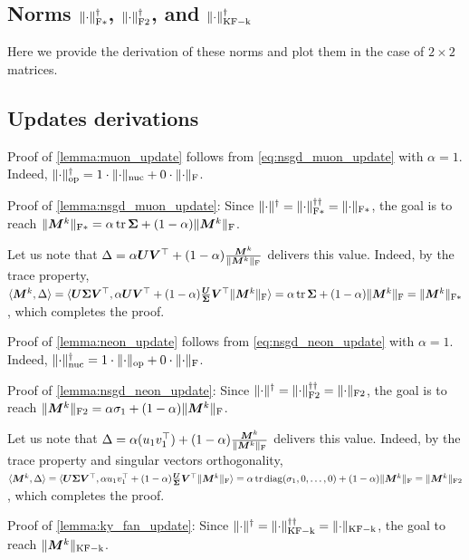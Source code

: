 \documentclass{article} %
\newcommand{\norm}[1]{\lVert #1\rVert}
\DeclarePairedDelimiter{\normf}{\|}{\|_\mathrm{F}}
\DeclarePairedDelimiter{\normkfk}{\|}{\|_\mathrm{KF-k}}
\DeclarePairedDelimiter{\normfstar}{\|}{\|_\mathrm{F*}}
\DeclarePairedDelimiter{\normftwo}{\|}{\|_\mathrm{F2}}
\DeclarePairedDelimiter{\norms}{\|}{\|_{\mathrm{op}}}
\DeclarePairedDelimiter{\normn}{\|}{\|_{\mathrm{nuc}}}
\def\<#1,#2>{\langle #1,#2\rangle}
\DeclareMathOperator{\tr}{tr}
\DeclareMathOperator{\diag}{diag}
\begin{document}
\subsection{Norms $\normfstar{\cdot}^\dagger$, $\normftwo{\cdot}^\dagger$, and $\normkfk{\cdot}^\dagger$}
Here we provide the derivation of these norms and plot them in the case of $2\times2$ matrices.

\subsection{Updates derivations}

Proof of \cref{lemma:muon_update} follows from \cref{eq:nsgd_muon_update} with $\alpha=1$. Indeed, $\norms{\cdot}^\dagger=1\cdot\normn{\cdot} + 0 \cdot \normf{\cdot} $.

Proof of \cref{lemma:nsgd_muon_update}:
Since $\norm{\cdot}^\dagger = \normfstar{\cdot}^{\dagger\dagger} = \normfstar{\cdot}$, the goal is to reach $\normfstar{\mM^k} = \alpha \tr{\mSigma} + (1-\alpha) \normf{\mM^k}$.

Let us note that $\Delta = \alpha \mU \mV^\top + (1-\alpha) \frac{\mM^k}{\normf{\mM^k}}$ delivers this value. Indeed, by the trace property, $\<\mM^k, \Delta> =\<\mU \mSigma \mV^\top, \alpha \mU \mV^\top + (1-\alpha) \frac{\mU \mSigma \mV^\top}{\normf{\mM^k}}> = \alpha \tr \mSigma + (1-\alpha) \normf{\mM^k} = \normfstar{\mM^k}$, which completes the proof.

Proof of \cref{lemma:neon_update} follows from \cref{eq:nsgd_neon_update} with $\alpha=1$. Indeed, $\normn{\cdot}^\dagger=1\cdot\norms{\cdot} + 0 \cdot \normf{\cdot} $.

Proof of \cref{lemma:nsgd_neon_update}:
Since $\norm{\cdot}^\dagger = \normftwo{\cdot}^{\dagger\dagger} = \normftwo{\cdot}$, the goal is to reach $\normftwo{\mM^k} = \alpha \sigma_1 + (1-\alpha) \normf{\mM^k}$.

Let us note that $\Delta = \alpha (u_1 v_1^\top) + (1-\alpha) \frac{\mM^k}{\normf{\mM^k}}$ delivers this value. Indeed, by the trace property and singular vectors orthogonality, $\<\mM^k, \Delta> =\<\mU \mSigma \mV^\top, \alpha u_1 v_1^\top + (1-\alpha) \frac{\mU \mSigma \mV^\top}{\normf{\mM^k}}> = \alpha \tr \diag({\sigma_1, 0, \dots, 0}) + (1-\alpha) \normf{\mM^k} = \normftwo{\mM^k}$, which completes the proof.


Proof of \cref{lemma:ky_fan_update}:
Since $\norm{\cdot}^\dagger = \normkfk{\cdot}^{\dagger\dagger} = \normkfk{\cdot}$, the goal to reach $\normkfk{\mM^k}$.
\end{document}
